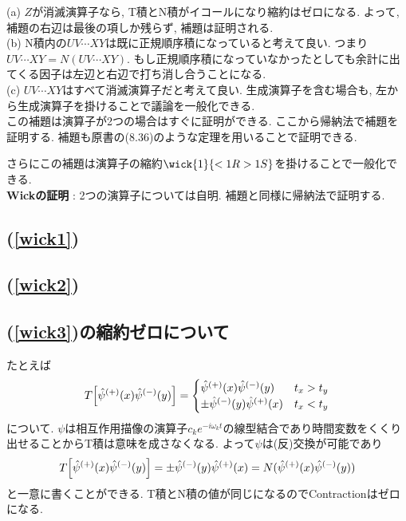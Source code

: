 \documentclass[10.5pt,a4paper]{jreport}
\newcommand{\hpsi}{\hat{\psi}}
\begin{document}
(a) $Z$が消滅演算子なら, T積とN積がイコールになり縮約はゼロになる. よって, 補題の右辺は最後の項しか残らず, 補題は証明される. \\

(b) N積内の$UV\cdots XY$は既に正規順序積になっていると考えて良い. つまり$UV\cdots XY = N(UV\cdots XY)$. もし正規順序積になっていなかったとしても余計に出てくる因子は左辺と右辺で打ち消し合うことになる. \\

(c) $UV\cdots XY$はすべて消滅演算子だと考えて良い. 生成演算子を含む場合も, 左から生成演算子を掛けることで議論を一般化できる. \\

この補題は演算子が2つの場合はすぐに証明ができる. ここから帰納法で補題を証明する. 補題も原書の(8.36)のような定理を用いることで証明できる.

さらにこの補題は演算子の縮約$\wick{1}{<1R >1S}$を掛けることで一般化できる. \\

\textbf{Wickの証明} : 2つの演算子については自明. 補題と同様に帰納法で証明する. 


\subsection{(\ref{wick1})}
\subsection{(\ref{wick2})}
\subsection{(\ref{wick3})の縮約ゼロについて}
たとえば
\begin{eqnarray}
  T\qty[\hpsi^{(+)}(x)\hpsi^{(-)}(y)] = \begin{cases}
    \hpsi^{(+)}(x)\hpsi^{(-)}(y) & t_x > t_y\\
    \pm\hpsi^{(-)}(y)\hpsi^{(+)}(x) & t_x < t_y
  \end{cases}
\end{eqnarray}
について. $\psi$は相互作用描像の演算子$c_ke^{-i\omega_k t}$の線型結合であり時間変数をくくり出せることからT積は意味を成さなくなる. よって$\psi$は(反)交換が可能であり
\begin{eqnarray}
  T\qty[\hpsi^{(+)}(x)\hpsi^{(-)}(y)] = \pm\hpsi^{(-)}(y)\hpsi^{(+)}(x) = N(\hpsi^{(+)}(x)\hpsi^{(-)}(y))
\end{eqnarray}
と一意に書くことができる. T積とN積の値が同じになるのでContractionはゼロになる.
\end{document}
